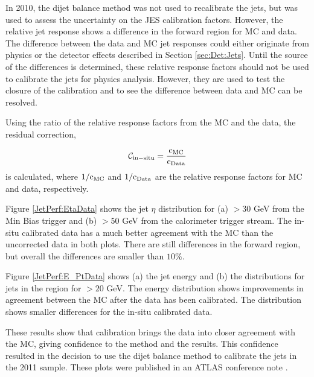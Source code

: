In 2010, the dijet \pt{} balance method was not used to recalibrate the jets, but was used to assess the uncertainty on the JES calibration factors.
However, the relative jet response \cite{ref:EtaInter2010} shows a difference in the forward region for MC and data.
The difference between the data and MC jet responses could either originate from physics or the detector effects described in Section \ref{sec:Det:Jets}. 
Until the source of the differences is determined, these relative response factors should not be used to calibrate the jets for physics analysis.
However, they are used to test the closure of the calibration and to see the difference between data and MC can be resolved.

Using the ratio of the relative response factors from the MC and the data, the residual correction, 

\begin{equation}
\mathcal{C_{\rm{in-situ}}} = \frac{\rm{c_{MC}}}{\rm{c_{Data}}}
\label{JetPerf:ResidualCorrection}
\end{equation}
is calculated, where ${1}/{\rm{c_{MC}}}$ and ${1}/{\rm{c_{Data}}}$ are the relative response factors for MC and data, respectively. 


Figure \ref{JetPerf:EtaData} shows the jet $\eta$ distribution for (a) \pt{} $>30$ GeV from the Min Bias trigger and (b) \pt{}$>50$ GeV from the calorimeter trigger stream. 
The in-situ calibrated data has a much better agreement with the MC than the uncorrected data in both plots. 
There are still differences in the forward region, but overall the differences are smaller than $10\%$.

Figure \ref{JetPerf:E_PtData} shows (a) the jet energy  and  (b) the \pt{} distributions  for jets in the region   for \pt{}$>20$ GeV. 
The energy distribution shows improvements in agreement between the MC after the data has been calibrated.
The \pt{} distribution shows smaller differences for the in-situ calibrated data.

These results show that calibration brings the data into  closer agreement with the MC, giving confidence to the method and the results.
This confidence resulted in the decision to use the dijet \pt{} balance method to calibrate the jets in the 2011 sample. 
These plots were published in an ATLAS conference note \cite{ref:EtaInter2010}.

